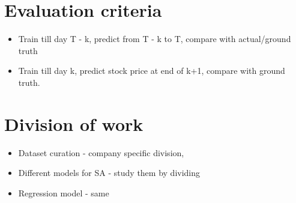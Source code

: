 \documentclass{article}
\begin{document}
\section{Evaluation criteria}
\begin{itemize}
    \item Train till day T - k, predict from T - k to T, compare with actual/ground truth
    \item Train till day k, predict stock price at end of k+1, compare with ground truth.
\end{itemize}

\section{Division of work}
\begin{itemize}
    \item Dataset curation - company specific division, 
    \item Different models for SA - study them by dividing
    \item Regression model - same
\end{itemize}
\end{document}
